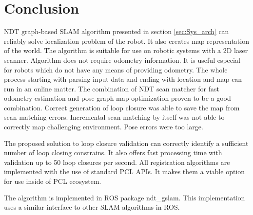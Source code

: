 \chapter*{Conclusion}
\gls{NDT} graph-based \gls{SLAM} algorithm presented in section \ref{sec:Sys_arch} can reliably solve localization problem of the robot. It also creates map representation of the world.  The algorithm is suitable for use on robotic systems with a 2D laser scanner. Algorithm does not require odometry information. It is useful especial for robots which do not have any means of providing odometry. The whole process starting with parsing input data and ending with location and map can run in an online matter. The combination of \gls{NDT} scan matcher for fast odometry estimation and pose graph map optimization proven to be a good combination. Correct generation of loop closure was able to save the map from scan matching errors.  Incremental scan matching by itself was not able to correctly map challenging environment. Pose errors were too large. 

The proposed solution to loop closure validation can correctly identify a sufficient number of loop closing constrains. It also offers fast processing time with validation up to 50 loop closures per second. All registration algorithms are implemented with the use of standard \gls{PCL} APIs. It makes them a viable option for use inside of \gls{PCL} ecosystem.

The algorithm is implemented in ROS package ndt\_gslam. This implementation uses a similar interface to other SLAM algorithms in \gls{ROS}.  
